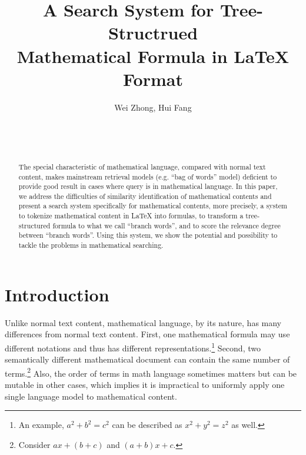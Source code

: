 \documentclass{acm_proc_article-sp}
\begin{document}
\title{A Search System for Tree-Structrued \\ Mathematical Formula in {\ttlit LaTeX} Format}

\author{
\alignauthor Wei Zhong,\; Hui Fang\\
       \\
       \\
       \\
}

\maketitle
\begin{abstract}
The special characteristic of mathematical language, compared with normal text content, makes mainstream retrieval models (e.g. ``bag of words'' model) deficient to provide good result in cases where query is in mathematical language. In this paper, we address the difficulties of similarity identification of mathematical contents and present a search system specifically for mathematical contents, more precisely, a system to tokenize mathematical content in \LaTeX{} into formulas, to transform a tree-structured formula to what we call ``branch words'', and to score the relevance degree between ``branch words''. Using this system, we show the potential and possibility to tackle the problems in mathematical searching.
\end{abstract}



\section{Introduction}
Unlike normal text content, mathematical language, by its nature, has many differences from normal text content. First, one mathematical formula may use different notations and thus has different representations.\footnote{An example, $a^2 + b^2 = c^2$ can be described as $x^2 + y^2 = z^2$ as well.} Second, two semantically different mathematical document can contain the same number of terms.\footnote{Consider $ax+(b+c)$ and $(a+b)x+c$.} Also, the order of terms in math language sometimes matters but can be mutable in other cases, which implies it is impractical to uniformly apply one single language model to mathematical content.
\end{document}
